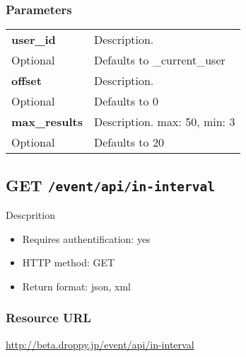 \documentclass[11pt,a4paper]{article}
\newcommand{\content}[1]{\begin{minipage}{10cm}\vspace{2mm}#1\vspace{2mm}\end{minipage}}
\begin{document}
  \subsubsection*{Parameters}
  \begin{table}[h]
    \begin{center}
      \begin{tabular}{l l}
        \hline 
      \textbf{user\_id} & \content{Description. }
      \\
      Optional & Defaults to \_current\_user\\
      \hline
      \textbf{offset} & \content{Description. }
      \\
      Optional & Defaults to 0\\
      \hline
      \textbf{max\_results} & \content{Description. max: 50, min: 3}
      \\
      Optional & Defaults to 20\\
      \hline
      \end{tabular}
    \end{center}
  \end{table}
  
      \newpage
      
      
  \subsection*{GET {\tt /event/api/in-interval}}
  Descprition
  \begin{itemize}
  \item Requires authentification: yes
  \item HTTP method: GET
  \item Return format: json, xml
  \end{itemize}
  \subsubsection*{Resource URL}
  \url{http://beta.droppy.jp/event/api/in-interval}
\end{document}
